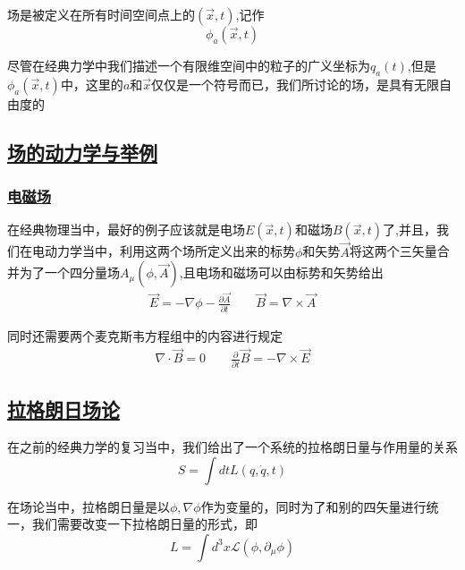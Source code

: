 场是被定义在所有时间空间点上的$(\vec{x},t)$,记作$$\phi_a(\vec{x},t)$$


尽管在经典力学中我们描述一个有限维空间中的粒子的广义坐标为$q_a(t)$,但是$\phi_a(\vec{x},t)$中，这里的$a$和$\vec{x}$仅仅是一个符号而已，我们所讨论的场，是具有无限自由度的







\subsection{\protect\hyperlink{:}{场的动力学与举例}}

\subsubsection{\protect\hyperlink{:}{电磁场}}

在经典物理当中，最好的例子应该就是电场$E(\vec{x},t)$和磁场$B(\vec{x},t)$了,并且，我们在电动力学当中，利用这两个场所定义出来的标势$\phi$和矢势$\vec{A}$将这两个三矢量合并为了一个四分量场$A_\mu(\phi,\vec{A})$,且电场和磁场可以由标势和矢势给出
\begin{align*}
    \vec{E}=-\nabla\phi-\frac{\partial\vec{A}}{\partial t}\quad\quad\vec{B}=\nabla\times\vec{A}
\end{align*}

同时还需要两个麦克斯韦方程组中的内容进行规定
\begin{align*}
    \nabla\cdot\vec{B}=0\quad\quad\frac{\partial}{\partial t}\vec{B}=-\nabla\times\vec{E}
\end{align*}



\subsection{\protect\hyperlink{:}{拉格朗日场论}}

在之前的经典力学的复习当中，我们给出了一个系统的拉格朗日量与作用量的关系
\[S=\int dt L(q,\dot{q},t)\]

在场论当中，拉格朗日量是以$\phi,\nabla\phi$作为变量的，同时为了和别的四矢量进行统一，我们需要改变一下拉格朗日量的形式，即
\begin{equation*}
    L=\int d^3x\mathcal{L}(\phi,\partial_\mu\phi)
\end{equation*}

